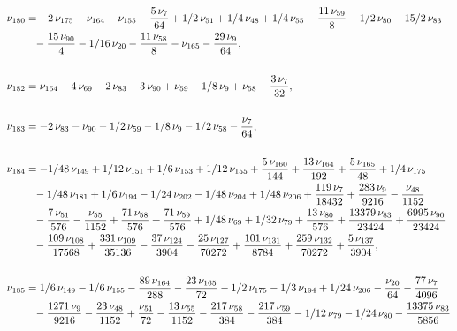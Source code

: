 \documentclass[a4paper,12pt, DIV=14, BCOR=5mm, twoside, headsepline]{scrbook}
\begin{document}
\begin{align}\label{AreaSol16}
\begin{aligned}
\nu_{{180}}&=-2\,\nu_{{175}}-\nu_{{164}}-\nu_{{155}}-{\frac {5\,\nu_{{7}}}{
64}}+1/2\,\nu_{{51}}+1/4\,\nu_{{48}}+1/4\,\nu_{{55}}-{\frac {11\,\nu_{
{59}}}{8}}-1/2\,\nu_{{80}}-15/2\,\nu_{{83}}\\
 &\hphantom{=}-{\frac {15\,\nu_{{90}}}{4}
}-1/16\,\nu_{{20}}-{\frac {11\,\nu_{{58}}}{8}}-\nu_{{165}}-{\frac {29
\,\nu_{{9}}}{64}},\\
\\
\nu_{{182}}&=\nu_{{164}}-4\,\nu_{{69}}-2\,\nu_{{83}}-
3\,\nu_{{90}}+\nu_{{59}}-1/8\,\nu_{{9}}+\nu_{{58}}-{\frac {3\,\nu_{{7}
}}{32}}, \\
\\
\nu_{{183}}&=-2\,\nu_{{83}}-\nu_{{90}}-1/2\,\nu_{{59}}-1/8\,\nu
_{{9}}-1/2\,\nu_{{58}}-{\frac {\nu_{{7}}}{64}}, \\
\\
\nu_{{184}}&=-1/48\,\nu_
{{149}}+1/12\,\nu_{{151}}+1/6\,\nu_{{153}}+1/12\,\nu_{{155}}+{\frac {5
\,\nu_{{160}}}{144}}+{\frac {13\,\nu_{{164}}}{192}}+{\frac {5\,\nu_{{
165}}}{48}}+1/4\,\nu_{{175}}\\
 &\hphantom{=}-1/48\,\nu_{{181}}+1/6\,\nu_{{194}}-1/24\,
\nu_{{202}}-1/48\,\nu_{{204}}+1/48\,\nu_{{206}}+{\frac {119\,\nu_{{7}}
}{18432}}+{\frac {283\,\nu_{{9}}}{9216}}-{\frac {\nu_{{48}}}{1152}}\\
 &\hphantom{=}-{
\frac {7\,\nu_{{51}}}{576}}-{\frac {\nu_{{55}}}{1152}}+{\frac {71\,\nu
_{{58}}}{576}}+{\frac {71\,\nu_{{59}}}{576}}+1/48\,\nu_{{69}}+1/32\,
\nu_{{79}}+{\frac {13\,\nu_{{80}}}{576}}+{\frac {13379\,\nu_{{83}}}{
23424}}+{\frac {6995\,\nu_{{90}}}{23424}}\\
 &\hphantom{=}-{\frac {109\,\nu_{{108}}}{
17568}}+{\frac {331\,\nu_{{109}}}{35136}}-{\frac {37\,\nu_{{124}}}{
3904}}-{\frac {25\,\nu_{{127}}}{70272}}+{\frac {101\,\nu_{{131}}}{8784
}}+{\frac {259\,\nu_{{132}}}{70272}}+{\frac {5\,\nu_{{137}}}{3904}},\\
\\
\nu_{{185}}&=1/6\,\nu_{{149}}-1/6\,\nu_{{155}}-{\frac {89\,\nu_{{164}}
}{288}}-{\frac {23\,\nu_{{165}}}{72}}-1/2\,\nu_{{175}}-1/3\,\nu_{{194}
}+1/24\,\nu_{{206}}-{\frac {\nu_{{20}}}{64}}-{\frac {77\,\nu_{{7}}}{
4096}}\\
 &\hphantom{=}-{\frac {1271\,\nu_{{9}}}{9216}}-{\frac {23\,\nu_{{48}}}{1152}}+
{\frac {\nu_{{51}}}{72}}-{\frac {13\,\nu_{{55}}}{1152}}-{\frac {217\,
\nu_{{58}}}{384}}-{\frac {217\,\nu_{{59}}}{384}}-1/12\,\nu_{{79}}-1/24
\,\nu_{{80}}-{\frac {13375\,\nu_{{83}}}{5856}}\\

\end{aligned}
\end{align}
\end{document}
